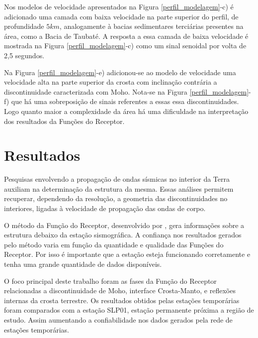 Nos modelos de velocidade apresentados na Figura \ref{perfil_modelagem}-c) é adicionado uma camada com baixa velocidade na parte superior do perfil, de profundidade $5 km$, analogamente à bacias sedimentares terciárias presentes na área, como a Bacia de Taubaté. A resposta a essa camada de baixa velocidade é mostrada na Figura \ref{perfil_modelagem}-c) como um sinal senoidal por volta de 2,5 segundos.

Na Figura \ref{perfil_modelagem}-e) adicionou-se ao modelo de velocidade uma velocidade alta na parte superior da crosta com inclinação contrária a discontinuidade caracterizada com Moho. Nota-se na Figura \ref{perfil_modelagem}-f) que há uma sobreposição de sinais referentes a essas essa discontinuidades. Logo quanto maior a complexidade da área há uma dificuldade na interpretação dos resultados da Funções do Receptor.

\section{Resultados}

Pesquisas envolvendo a propagação de ondas sísmicas no interior da Terra auxiliam na determinação da estrutura da mesma. Essas análises permitem recuperar, dependendo da resolução, a geometria das discontinuidades no interiores, ligadas à velocidade de propagação das ondas de corpo.  

O método da Função do Receptor, desenvolvido por \cite{Langston_1977}, gera informações sobre a estrutura debaixo da estação sismográfica. A confiança nos resultados gerados pelo método varia em função da quantidade e qualidade das Funções do Receptor. Por isso é importante que a estação esteja funcionando corretamente e tenha uma grande quantidade de dados disponíveis.

O foco principal deste trabalho foram as fases da Função do Receptor relacionadas a discontinuidade de Moho, interface Crosta-Manto, e reflexões internas da crosta terrestre. Os resultados obtidos pelas estações temporárias foram comparados com a estação SLP01, estação permanente próxima a região de estudo. Assim aumentando a confiabilidade nos dados gerados pela rede de estações temporárias.

